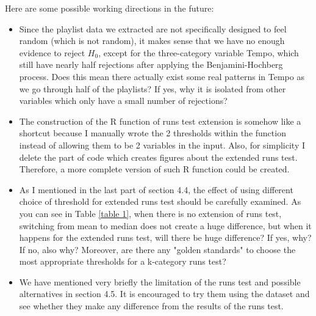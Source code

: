 \documentclass[12pt]{article}
\theoremstyle{plain}
\theoremstyle{definition}
\theoremstyle{remark}
\begin{document}
Here are some possible working directions in the future:
\begin{itemize}
    \item Since the playlist data we extracted are not specifically designed to feel random (which is not random), it makes sense that we have no enough evidence to reject $H_0$, except for the three-category variable Tempo, which still have nearly half rejections after applying the Benjamini-Hochberg process. Does this mean there actually exist some real patterns in Tempo as we go through half of the playlists? If yes, why it is isolated from other variables which only have a small number of rejections?
    \item The construction of the R function of runs test extension is somehow like a shortcut because I manually wrote the 2 thresholds within the function instead of allowing them to be 2 variables in the input. Also, for simplicity I delete the part of code which creates figures about the extended runs test. Therefore, a more complete version of such R function could be created.
    \item As I mentioned in the last part of section 4.4, the effect of using different choice of threshold for extended runs test should be carefully examined. As you can see in Table \ref{table 1}, when there is no extension of runs test, switching from mean to median does not create a huge difference, but when it happens for the extended runs test, will there be huge difference? If yes, why? If no, also why? Moreover, are there any "golden standards" to choose the most appropriate thresholds for a k-category runs test? 
    \item We have mentioned very briefly the limitation of the runs test and possible alternatives in section 4.5. It is encouraged to try them using the dataset and see whether they make any difference from the results of the runs test.
\end{itemize}
\end{document}
